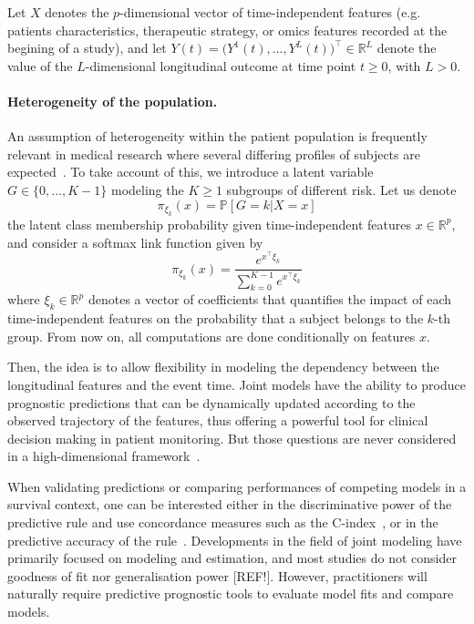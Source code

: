 \documentclass[11pt]{article}
\newcommand{\R}{\mathds R}
\renewcommand{\P}{\mathds P}
\begin{document}
Let $X$ denotes the $p$-dimensional vector of time-independent features (e.g. patients characteristics, therapeutic strategy, or omics features recorded at the begining of a study), and let  $Y(t) = \big(Y^1(t), \ldots, Y^L(t) \big)^\top \in \R^L$ denote the value of the $L$-dimensional longitudinal outcome at time point $t \geq 0$, with $L > 0$.


\paragraph{Heterogeneity of the population.}

An assumption of heterogeneity within the patient population is frequently relevant in medical research where several differing profiles of subjects are expected~\citep{bussy2019c}. To take account of this, we introduce a latent variable $G \in \{0, \ldots, K-1\}$ modeling the $K \geq 1$ subgroups of different risk. Let us denote
\[ \pi_{\xi_k}(x) = \P[G=k|X=x] \]
the latent class membership probability given time-independent features $x \in \R^p$, and consider a softmax link function given by
\[ \pi_{\xi_k}(x) = \dfrac{e^{x^\top\xi_k}}{\sum_{k=0}^{K-1}e^{x^\top\xi_k}} \]
where $\xi_k \in \R^p$ denotes a vector of coefficients that quantifies the impact of each time-independent features on the probability that a subject belongs to the $k$-th group.  From now on, all computations are done conditionally on features $x$.

Then, the idea is to allow flexibility in modeling the dependency between the longitudinal features and the event time.
Joint models have the ability to produce prognostic predictions that can be dynamically updated according to the observed trajectory of the features, thus offering a powerful tool for clinical decision making in patient monitoring. But those questions are never considered in a high-dimensional framework~\citep{proust2009development,rizopoulos2011dynamic}.

When validating predictions or comparing performances of competing models in a survival context, one can be interested either in the discriminative power of the predictive rule and use concordance measures such as the C-index~\citep{heagerty2005survival}, or in the predictive accuracy of the rule~\citep{schemper2000predictive}.
Developments in the field of joint modeling have primarily focused on modeling and estimation, and most studies do not consider goodness of fit nor generalisation power [REF!]. However, practitioners will naturally require predictive prognostic tools to evaluate model fits and compare models. 
\end{document}
